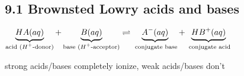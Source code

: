 \subsection*{9.1 Brownsted Lowry acids and bases}
    \begin{center}$
        \underbrace{HA (aq)}_\text{acid ($H^+$-donor)} + \underbrace{B (aq)}_\text{base ($H^+$-acceptor)} \rightleftharpoons \underbrace{A^- (aq)}_\text{\vphantom{$H^+$} conjugate base} + \underbrace{HB^+ (aq)}_\text{\vphantom{$H^+$} conjugate acid}
    $\end{center}
    strong acids/bases completely ionize, weak acids/bases don't
